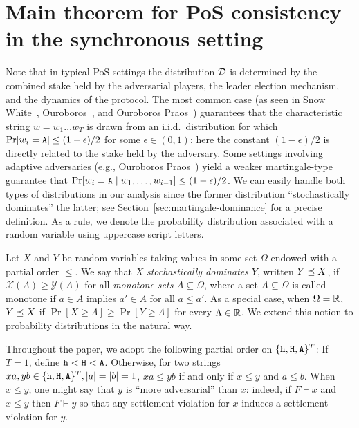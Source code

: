   \section{Main theorem for PoS consistency in the synchronous setting}\label{sec:main-thm-multihonest}
  Note that in typical PoS settings the distribution $\mathcal{D}$
  is determined by the combined stake held by the adversarial players,
  the leader election mechanism, and the dynamics of the protocol. The
  most common case (as seen in Snow White~\cite{SnowWhite},
  Ouroboros~\cite{Ouroboros}, and Ouroboros Praos~\cite{Praos})
  guarantees that the characteristic string $w = w_1 \ldots w_T$ is
  drawn from an i.i.d.\ distribution for which
  $\Pr[w_i = \mathtt{A}] \leq (1 - \epsilon)/2$ for some $\epsilon \in (0, 1)$;
  here the constant $(1-\epsilon)/2$ is directly related to the stake
  held by the adversary. Some settings involving adaptive adversaries
  (e.g., Ouroboros Praos~\cite{Praos}) yield a weaker martingale-type
  guarantee that
  $\Pr[w_i = \mathtt{A} \mid w_1, \ldots, w_{i-1}] \leq (1 - \epsilon)/2$.  We
  can easily handle both types of distributions in our analysis since
  the former distribution ``stochastically dominates'' the latter; 
  see Section~\ref{sec:martingale-dominance} for a precise definition.
  As a rule, we denote the
  probability distribution associated with a random variable using
  uppercase script letters. 
  \begin{definition}\label{def:dominance-mh} 
    Let $X$ and $Y$ be random variables taking values in some set $\Omega$ 
    endowed with a partial order $\leq$. 
    We say that $X$ \emph{stochastically dominates} $Y$, 
    written $Y \preceq X$, if 
    $
      \mathcal{X}(A) \geq \mathcal{Y}(A)
    $ 
    for all \emph{monotone sets} $A \subseteq \Omega$, 
    where a set $A \subseteq \Omega$ is called 
    monotone if $a \in A$ implies $a' \in A$ for all $a \leq a'$.
    As a special case, when $\Omega = \mathbb{R}$,  $Y \preceq X$ if
    $\Pr[X \geq \Lambda] \geq \Pr[Y \geq \Lambda]$
    for every $\Lambda \in \mathbb{R}$.  
    We extend this notion to probability
    distributions in the natural way.
  \end{definition}

  Throughout the paper, we adopt the following partial order on
  $\{\mathtt{h}, \mathtt{H}, \mathtt{A}\}^T$: If $T = 1$, define $\mathtt{h} < \mathtt{H} < \mathtt{A}$.  Otherwise,
  for two strings $xa, yb \in \{\mathtt{h}, \mathtt{H}, \mathtt{A}\}^T, |a| = |b| = 1$,
  $xa \leq yb$ if and only if $x \leq y$ and $a \leq b$. When
  $x \leq y$, one might say that $y$ is ``more adversarial'' than $x$:
  indeed, if $F \vdash x$ and $x \leq y$ then $F \vdash y$ so that any
  settlement violation for $x$ induces a settlement violation for $y$.

